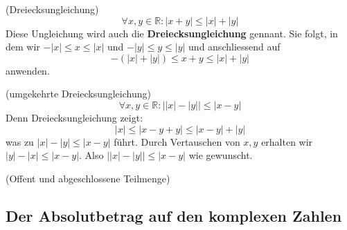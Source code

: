 \documentclass[../Analysis1_script.tex]{subfiles}
\begin{document}
\begin{corollary}{(Dreiecksungleichung)}
	\[\forall x, y \in \mathbb{R}: |x + y| \leq |x| + |y|\]
	Diese Ungleichung wird auch die \textbf{Dreiecksungleichung} gennant. Sie folgt, in dem wir $-|x| \leq x \leq |x|$ und $-|y| \leq y \leq |y|$ und anschliessend auf
	\[-(|x| + |y|) \leq x + y \leq |x| + |y|\]
	anwenden.
\end{corollary}

\begin{corollary}{(umgekehrte Dreiecksungleichung)}
	\[\forall x, y \in \mathbb{R}: \big||x| - |y|\big| \leq |x - y|\]
	Denn Dreiecksungleichung zeigt:
	\[|x| \leq |x - y + y| \leq |x - y| + |y|\]
	was zu $|x| - |y| \leq |x - y|$ führt. Durch Vertauschen von $x, y$ erhalten wir $|y| - |x| \leq |x - y|$. Also $\big||x| - |y|\big| \leq |x - y|$ wie gewunscht. 
\end{corollary}

\begin{definition}{(Offent und abgeschlossene Teilmenge)}
\end{definition}

\subsection{Der Absolutbetrag auf den komplexen Zahlen}
\end{document}

